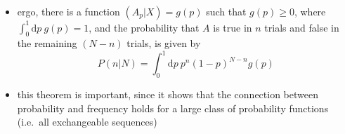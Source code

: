 \documentclass[../jaynes_prob_theory_notes.tex]{subfiles}
\begin{document}
\begin{itemize}
                \item ergo, there is a function \((A_p|X) = g(p)\) such that \(g(p) \geq 0\), where \(\int^{1}_{0}\text{d}p~g(p) = 1\), and the probability that \(A\) is true in \(n\) trials and false in the remaining \((N-n)\) trials, is given by
                    \begin{equation*} 
                        P(n|N) = \int^{1}_{0}\text{d}p~p^n {(1-p)}^{N-n} g(p)
                    \end{equation*}
                \item this theorem is important, since it shows that the connection between probability and frequency holds for a large class of probability functions (i.e.\ all exchangeable sequences)
            \end{itemize}
\end{document}
